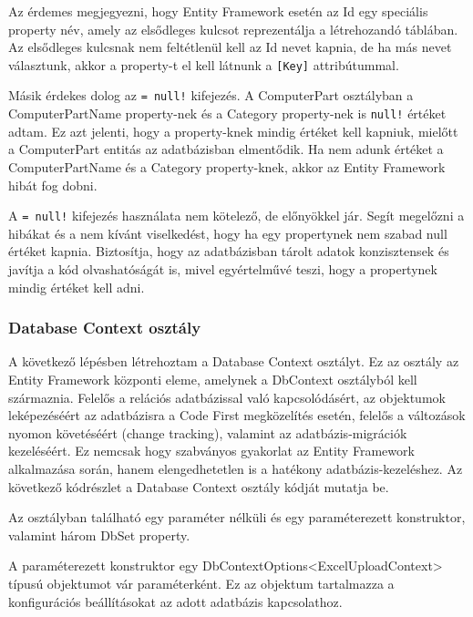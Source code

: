 \documentclass[
]{thesis-ekf}
\theoremstyle{definition}
\theoremstyle{remark}
\begin{document}
	
Az érdemes megjegyezni, hogy Entity Framework esetén az Id egy speciális property név, amely az elsődleges kulcsot reprezentálja a létrehozandó táblában. Az elsődleges kulcsnak nem feltétlenül kell az Id nevet kapnia, de ha más nevet választunk, akkor a property-t el kell látnunk a \texttt{[Key]} attribútummal.

Másik érdekes dolog az \texttt{= null!} kifejezés. A ComputerPart osztályban a ComputerPartName property-nek és a Category property-nek is \texttt{null!} értéket adtam. Ez azt jelenti, hogy a property-knek mindig értéket kell kapniuk, mielőtt a ComputerPart entitás az adatbázisban elmentődik. Ha nem adunk értéket a ComputerPartName és a Category property-knek, akkor az Entity Framework hibát fog dobni.

A \texttt{= null!} kifejezés használata nem kötelező, de előnyökkel jár. Segít megelőzni a hibákat és a nem kívánt viselkedést, hogy ha egy propertynek nem szabad null értéket kapnia. Biztosítja, hogy az adatbázisban tárolt adatok konzisztensek és javítja a kód olvashatóságát is, mivel egyértelművé teszi, hogy a propertynek mindig értéket kell adni.

\subsubsection{Database Context osztály}
A következő lépésben létrehoztam a Database Context osztályt. Ez az osztály az Entity Framework központi eleme, amelynek a DbContext osztályból kell származnia. Felelős a relációs adatbázissal való kapcsolódásért, az objektumok leképezéséért az adatbázisra a Code First megközelítés esetén, felelős a változások nyomon követéséért (change tracking), valamint az adatbázis-migrációk kezeléséért. Ez nemcsak hogy szabványos gyakorlat az Entity Framework alkalmazása során, hanem elengedhetetlen is a hatékony adatbázis-kezeléshez. Az következő kódrészlet a  Database Context osztály kódját mutatja be.


Az osztályban található egy paraméter nélküli és egy paraméterezett konstruktor, valamint három DbSet property. 

A paraméterezett konstruktor egy DbContextOptions<ExcelUploadContext> típusú objektumot vár paraméterként. Ez az objektum tartalmazza a konfigurációs beállításokat az adott adatbázis kapcsolathoz.
\end{document}
